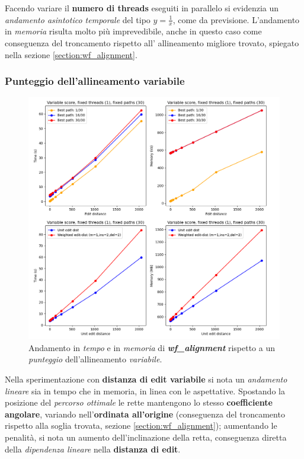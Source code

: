     Facendo variare il \textbf{numero di threads} eseguiti in parallelo si evidenzia un \emph{andamento asintotico temporale} del tipo $y = \frac{1}{x}$, come da previsione. L'andamento in \emph{memoria} risulta molto più imprevedibile, anche in questo caso come conseguenza del troncamento rispetto all' allineamento migliore trovato, spiegato nella sezione \ref{section:wf_alignment}.
\clearpage

\subsubsection{Punteggio dell'allineamento variabile}
     \begin{figure}[h]
        \centering
        \includegraphics[width=1.0\linewidth]{images/benchmark_score_variable.png} 
        \caption[Andamento con score variabile]{Andamento in \emph{tempo} e in \emph{memoria} di \textbf{\textit{wf\_alignment}} rispetto a un \emph{punteggio} dell'allineamento \emph{variabile}.}
        \label{fig:benchmark_score}
    \end{figure}
    \vspace{20pt}
    
    Nella sperimentazione con \textbf{distanza di edit variabile} si nota un \emph{andamento lineare} sia in tempo che in memoria, in linea con le aspettative. Spostando la posizione del \emph{percorso ottimale} le rette mantengono lo stesso \textbf{coefficiente angolare}, variando nell'\textbf{ordinata all'origine} (conseguenza del troncamento rispetto alla soglia trovata, sezione \ref{section:wf_alignment}); aumentando le penalità, si nota un aumento dell'inclinazione della retta, conseguenza diretta della \emph{dipendenza lineare} nella \textbf{distanza di edit}.

